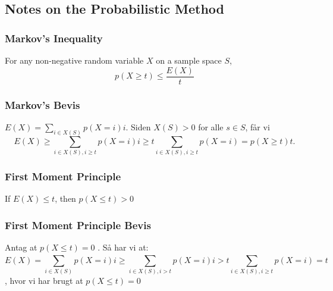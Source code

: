 \documentclass{beamer}
\begin{document}
\subsection{Notes on the Probabilistic Method}
\label{subsec:label}

\begin{frame}
  \frametitle{Markov's Inequality}
  \begin{theorem}
    For any non-negative random variable $X$ on a sample space $S$,
    \begin{equation}
      p(X \geq t) \leq \frac{E(X)}{t}
    \end{equation}
  \end{theorem}
\end{frame}

\begin{frame}
  \frametitle{Markov's Bevis}
  $E(X) = \sum_{i \in X(S)}p(X=i)i$. Siden $X(S) > 0$ for alle $s \in S$, får vi
  \begin{equation}
E(X) \geq \sum_{i \in X(S), i \geq t}p(X=i)i \geq t \sum_{i \in X(S), i \geq t}p(X = i) = p(X \geq t)t.
  \end{equation}
\end{frame}

\begin{frame}
  \frametitle{First Moment Principle}
  \begin{theorem}
If $E(X) \leq t$, then $p(X \leq t) > 0$
  \end{theorem}
\end{frame}

\begin{frame}
  \frametitle{First Moment Principle Bevis}
  Antag at $p(X \leq t) = 0$ . Så har vi at:
  \begin{equation}
E(X) = \sum_{i \in X(S)}^{}p(X=i)i \geq \sum_{i \in X(S), i > t}^{} p(X=i)i > t \sum_{i \in X(S), i \geq t}^{}p (X=i) =t
\end{equation},
hvor vi har brugt at $p(X \leq t) = 0$ 

\end{frame}
\end{document}
